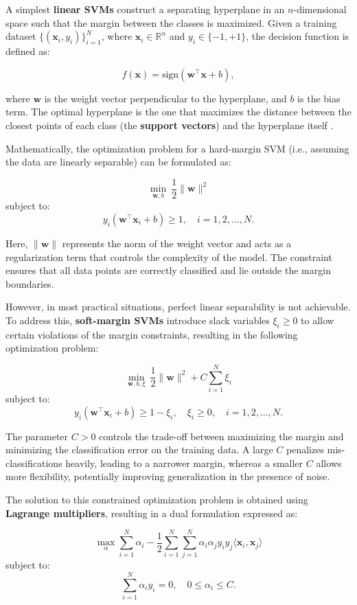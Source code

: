 A simplest \textbf{linear SVMs} construct a separating hyperplane in an \(n\)-dimensional space such that the margin between the classes is maximized. Given a training dataset \(\{(\mathbf{x}_i, y_i)\}_{i=1}^{N}\), where \(\mathbf{x}_i \in \mathbb{R}^n\) and \(y_i \in \{-1, +1\}\), the decision function is defined as:

\[
f(\mathbf{x}) = \text{sign}(\mathbf{w}^\top \mathbf{x} + b),
\]

where \(\mathbf{w}\) is the weight vector perpendicular to the hyperplane, and \(b\) is the bias term. The optimal hyperplane is the one that maximizes the distance between the closest points of each class (the \textbf{support vectors}) and the hyperplane itself \citep{cortes1995}.

Mathematically, the optimization problem for a hard-margin SVM (i.e., assuming the data are linearly separable) can be formulated as:

\[
\min_{\mathbf{w}, b} \ \frac{1}{2} \|\mathbf{w}\|^2
\] subject to: \[
y_i (\mathbf{w}^\top \mathbf{x}_i + b) \geq 1, \quad i = 1, 2, \ldots, N.
\]

Here, \(\|\mathbf{w}\|\) represents the norm of the weight vector and acts as a regularization term that controls the complexity of the model. The constraint ensures that all data points are correctly classified and lie outside the margin boundaries.

However, in most practical situations, perfect linear separability is not achievable. To address this, \textbf{soft-margin SVMs} introduce slack variables \(\xi_i \geq 0\) to allow certain violations of the margin constraints, resulting in the following optimization problem:

\[
\min_{\mathbf{w}, b, \xi} \ \frac{1}{2} \|\mathbf{w}\|^2 + C \sum_{i=1}^{N} \xi_i
\] subject to: \[
y_i (\mathbf{w}^\top \mathbf{x}_i + b) \geq 1 - \xi_i, \quad \xi_i \geq 0, \quad i = 1, 2, \ldots, N.
\]

The parameter \(C > 0\) controls the trade-off between maximizing the margin and minimizing the classification error on the training data. A large \(C\) penalizes mis-classifications heavily, leading to a narrower margin, whereas a smaller \(C\) allows more flexibility, potentially improving generalization in the presence of noise.

The solution to this constrained optimization problem is obtained using \textbf{Lagrange multipliers}, resulting in a dual formulation expressed as:

\[
\max_{\alpha} \sum_{i=1}^{N} \alpha_i - \frac{1}{2} \sum_{i=1}^{N}\sum_{j=1}^{N} \alpha_i \alpha_j y_i y_j \langle \mathbf{x}_i, \mathbf{x}_j \rangle
\] subject to: \[
\sum_{i=1}^{N} \alpha_i y_i = 0, \quad 0 \leq \alpha_i \leq C.
\]

